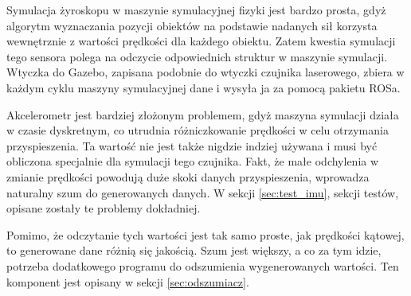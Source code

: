 	Symulacja żyroskopu w maszynie symulacyjnej fizyki jest bardzo prosta, gdyż algorytm wyznaczania pozycji obiektów na podstawie nadanych sił korzysta wewnętrznie z
	wartości prędkości dla każdego obiektu. Zatem kwestia symulacji tego sensora polega na odczycie odpowiednich struktur w maszynie symulacji.
	Wtyczka do Gazebo, zapisana podobnie do wtyczki czujnika laserowego, zbiera w każdym cyklu maszyny symulacyjnej dane i wysyła ja za pomocą pakietu ROSa.
	
	Akcelerometr jest bardziej złożonym problemem, gdyż maszyna symulacji działa w czasie dyskretnym, co utrudnia różniczkowanie prędkości w celu otrzymania przyspieszenia.
	Ta wartość nie jest także nigdzie indziej używana i musi być obliczona specjalnie dla symulacji tego czujnika.
	Fakt, że małe odchylenia w zmianie prędkości powodują duże skoki danych przyspieszenia, wprowadza naturalny szum do generowanych danych.
	W sekcji \ref{sec:test_imu}, sekcji testów, opisane zostały te problemy dokładniej.
	
	Pomimo, że odczytanie tych wartości jest tak samo proste, jak prędkości kątowej, to generowane dane różnią się jakością.
	Szum jest większy, a co za tym idzie, potrzeba dodatkowego programu do odszumienia wygenerowanych wartości.
	Ten komponent jest opisany w sekcji \ref{sec:odszumiacz}.

